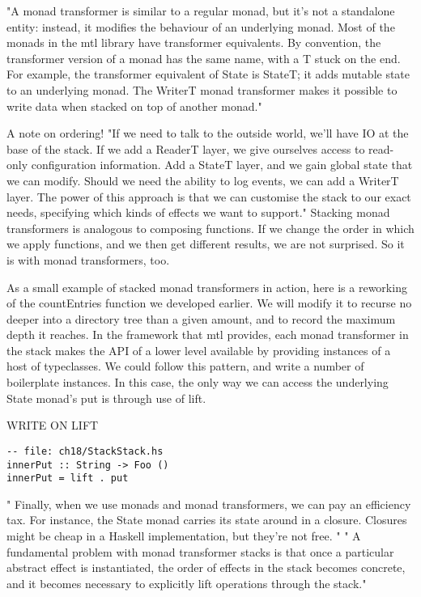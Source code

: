 "A monad transformer is similar to a regular monad,
but it's not a standalone entity: instead,
it modifies the behaviour of an underlying monad.
Most of the monads in the mtl library have transformer equivalents.
By convention, the transformer version of a monad has the same name,
with a T stuck on the end.
For example, the transformer equivalent of State is StateT;
it adds mutable state to an underlying monad.
The WriterT monad transformer makes it possible to write data when stacked on top of another monad."


A note on ordering!
"If we need to talk to the outside world, we'll have IO at the base of the stack.
If we add a ReaderT layer, we give ourselves access to read-only configuration information.
Add a StateT layer, and we gain global state that we can modify.
Should we need the ability to log events, we can add a WriterT layer.
The power of this approach is that we can customise the stack to our exact needs,
specifying which kinds of effects we want to support."
Stacking monad transformers is analogous to composing functions.
If we change the order in which we apply functions, and we then get different results, we are not surprised. So it is with monad transformers, too.

As a small example of stacked monad transformers in action, here is a reworking of the countEntries function we developed earlier. We will modify it to recurse no deeper into a directory tree than a given amount, and to record the maximum depth it reaches.
In the framework that mtl provides, each monad transformer in the stack makes the API of a lower level available by providing instances of a host of typeclasses. We could follow this pattern, and write a number of boilerplate instances.
In this case, the only way we can access the underlying State monad's put is through use of lift.

WRITE ON LIFT
\begin{verbatim}
-- file: ch18/StackStack.hs
innerPut :: String -> Foo ()
innerPut = lift . put
\end{verbatim}

"
Finally, when we use monads and monad transformers, we can pay an efficiency tax.
For instance, the State monad carries its state around in a closure.
Closures might be cheap in a Haskell implementation, but they're not free.
"
\cite{o2008real}
"
A fundamental problem with monad transformer stacks is that
once a particular abstract effect is instantiated,
the order of effects in the stack becomes concrete,
and it becomes necessary to explicitly lift operations
through the stack."
\cite{kammar2013handlers}


